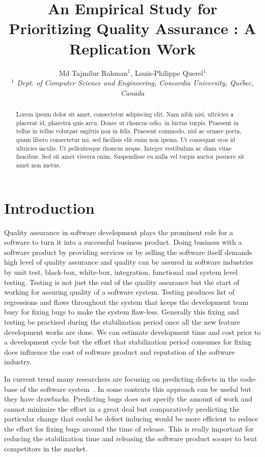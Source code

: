 \documentclass[10pt, conference]{IEEEtran}
\title{An Empirical Study for Prioritizing Quality Assurance : A Replication Work}
\author{Md Tajmilur Rahman$^{1}$, Louis-Philippe Querel$^{1}$
    \\
	\emph{$^{1}$ Dept. of Computer Science and Engineering, Concordia University, Qu\'{e}bec, Canada}
}
\begin{document}
\maketitle

\begin{abstract}
Lorem ipsum dolor sit amet, consectetur adipiscing elit. Nam nibh nisi, ultricies a placerat id, pharetra quis arcu. Donec ut rhoncus odio, in luctus turpis. Praesent in tellus in tellus volutpat sagittis non in felis. Praesent commodo, nisl ac ornare porta, quam libero consectetur mi, sed facilisis elit enim non ipsum. Ut consequat eros id ultricies iaculis. Ut pellentesque rhoncus neque. Integer vestibulum ac diam vitae faucibus. Sed sit amet viverra enim. Suspendisse eu nulla vel turpis auctor posuere sit amet non metus.
\end{abstract}

\section{Introduction}
\label{sec:introduction}

Quality assurance in software development plays the prominent role for a software to turn it into a successful business product. Doing business with a software product by providing services or by selling the software itself demands high level of quality assurance and quality can be assured in software industries by unit test, black-box, white-box, integration, functional and system level testing. Testing is not just the end of the quality assurance but the start of working for assuring quality of a software system. Testing produces list of regressions and flaws throughout the system that keeps the development team busy for fixing bugs to make the system flaw-less. Generally this fixing and testing be practised during the stabilization period once all the new feature development works are done. We can estimate development time and cost prior to a development cycle but the effort that stabilization period consumes for fixing does influence the cost of software product and reputation of the software industry. 

In current trend many researchers are focusing on predicting defects in the code-base of the software system~\cite{Gyimothy2005IEEE}. In some contexts this approach can be useful but they have drawbacks. Predicting bugs does not specify the amount of work and cannot minimize the effort in a great deal but comparatively predicting the particular change that could be defect inducing would be more efficient to reduce the effort for fixing bugs around the time of release. This is really important for reducing the stabilization time and releasing the software product sooner to beat competitors in the market.
\end{document}
